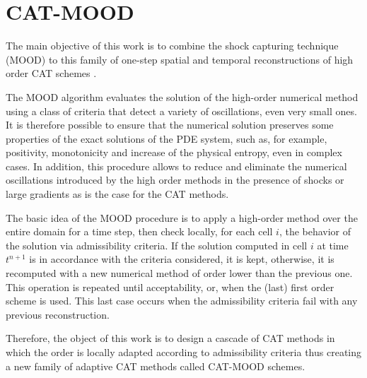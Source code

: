%
%
\section{CAT-MOOD} \label{sec:CATMOOD}
The main objective of this work is to combine the \aposteriori shock capturing technique (MOOD) \cite{CDL1} to this family of one-step spatial and temporal reconstructions of high order CAT schemes \cite{CATMOOD_1D}.  

The MOOD algorithm evaluates \aposteriori the solution of the high-order numerical method using a class of criteria that detect a variety of oscillations, even very small ones. It is therefore possible to ensure that the numerical solution preserves some properties of the exact solutions of the PDE system, such as, for example, positivity, monotonicity and increase of the physical entropy, even in complex cases. 
In addition, this procedure allows to reduce and eliminate the numerical oscillations introduced by the high order methods in the presence of shocks or large gradients as is the case for the CAT methods. 

The basic idea of the MOOD procedure is to apply a high-order method over the entire domain for a time step, then check locally, for each cell $i$, the behavior of the solution via admissibility criteria. If the solution computed in cell $i$ at time $t^{n+1}$ is in accordance with the criteria considered, it is kept, otherwise, it is recomputed with a new numerical method of order lower than the previous one. This operation is repeated until acceptability, or, when the (last) first order scheme is used. This last case occurs when the admissibility criteria fail with any previous reconstruction.

Therefore, the object of this work is to design a cascade of CAT methods in which the order is locally adapted according to \aposteriori admissibility criteria thus creating a new family of adaptive CAT methods called CAT-MOOD schemes. 


